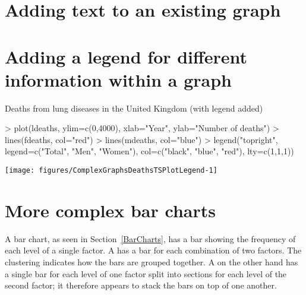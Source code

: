 \section{Adding text to an existing graph} 
 
 
\section{Adding a legend for different information within a graph} 
 
\begin{exhibit} 
\begin{center} 
\caption{Deaths from lung diseases in the United Kingdom (with legend added)} 
\label{LungsLegend} 
\begin{Schunk}
\begin{Sinput}
> plot(ldeaths, ylim=c(0,4000), xlab="Year", ylab="Number of deaths") 
> lines(fdeaths, col="red") 
> lines(mdeaths, col="blue") 
> legend("topright", legend=c("Total", "Men", "Women"), col=c("black", "blue", "red"), lty=c(1,1,1)) 
\end{Sinput}

\texttt{[image: figures/ComplexGraphsDeathsTSPlotLegend-1]} \end{Schunk}
\end{center} 
\end{exhibit} 
 
\section{More complex bar charts} 
 
A bar chart, as seen in Section~\ref{BarCharts}, has a bar showing the frequency of each level of a single factor. A  has a bar for each combination of two factors. The clustering indicates how the bars are grouped together. A  on the other hand has a single bar for each level of one factor split into sections for each level of the second factor; it therefore appears to stack the bars on top of one another. 
 
